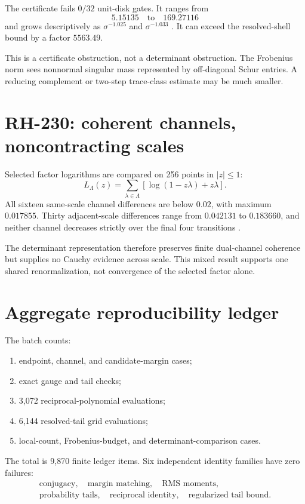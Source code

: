 \documentclass[11pt]{article}
\theoremstyle{remark}\newtheorem{remark}[theorem]{Remark}
\begin{document}
The certificate fails $0/32$ unit-disk gates. It ranges from
\[
 5.15135\quad\text{to}\quad169.27116
\]
and grows descriptively as $\sigma^{-1.025}$ and $\sigma^{-1.033}$
\citep{WangRH229}. It can exceed the resolved-shell bound by a factor
$5563.49$.

This is a certificate obstruction, not a determinant obstruction. The
Frobenius norm sees nonnormal singular mass represented by off-diagonal Schur
entries. A reducing complement or two-step trace-class estimate may be much
smaller.

\section{RH-230: coherent channels, noncontracting scales}

Selected factor logarithms are compared on 256 points in $|z|\le1$:
\[
 L_\Lambda(z)=
 \sum_{\lambda\in\Lambda}
 [\log(1-z\lambda)+z\lambda].
\]
All sixteen same-scale channel differences are below $0.02$, with maximum
$0.017855$. Thirty adjacent-scale differences range from $0.042131$ to
$0.183660$, and neither channel decreases strictly over the final four
transitions \citep{WangRH230}.

The determinant representation therefore preserves finite dual-channel
coherence but supplies no Cauchy evidence across scale. This mixed result
supports one shared renormalization, not convergence of the selected factor
alone.

\section{Aggregate reproducibility ledger}

The batch counts:
\begin{enumerate}[leftmargin=2em]
\item endpoint, channel, and candidate-margin cases;
\item exact gauge and tail checks;
\item 3,072 reciprocal-polynomial evaluations;
\item 6,144 resolved-tail grid evaluations;
\item local-count, Frobenius-budget, and determinant-comparison cases.
\end{enumerate}
The total is 9,870 finite ledger items. Six independent identity families
have zero failures:
\[
 \begin{gathered}
 \text{conjugacy},\quad
 \text{margin matching},\quad
 \text{RMS moments},\\
 \text{probability tails},\quad
 \text{reciprocal identity},\quad
 \text{regularized tail bound}.
 \end{gathered}
\]
\end{document}
